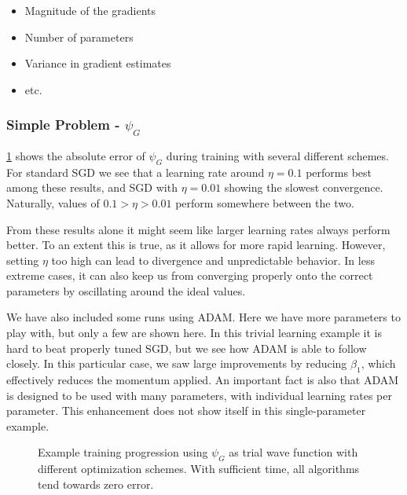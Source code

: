 \documentclass[Thesis.tex]{subfiles}
\begin{document}
\begin{itemize}
  \item Magnitude of the gradients
  \item Number of parameters
  \item Variance in gradient estimates
  \item etc.
\end{itemize}


\subsubsection{Simple Problem - $\psi_G$}

\cref{fig:verify-lr-gaussian} shows the absolute error of $\psi_G$ during
training with several different schemes. For standard SGD we see that a learning
rate around $\eta = 0.1$ performs best among these results, and SGD with $\eta
=0.01$ showing the slowest convergence. Naturally, values of $0.1>\eta>0.01$
perform somewhere between the two.

From these results alone it might seem like
larger learning rates always perform better. To an extent this is true, as it
allows for more rapid learning. However, setting $\eta$ too high can lead to
divergence and unpredictable behavior. In less extreme cases, it can also keep
us from converging properly onto the correct parameters by oscillating around
the ideal values.

We have also included some runs using ADAM. Here we have more parameters to play
with, but only a few are shown here. In this trivial learning example it is hard
to beat properly tuned SGD, but we see how ADAM is able to follow closely. In
this particular case, we saw large improvements by reducing $\beta_1$, which
effectively reduces the momentum applied. An important fact is also that ADAM is
designed to be used with many parameters, with individual learning rates per
parameter. This enhancement does not show itself in this single-parameter example.


\begin{figure}[h]
  \centering
    \resizebox{\linewidth}{!}{%
      
    }
  \caption[Comparison of optimization schemes on a simple problem]{\label{fig:verify-lr-gaussian}Example training progression using
    $\psi_G$ as trial wave function with different optimization schemes. With
    sufficient time, all algorithms tend towards zero error.}
\end{figure}
\end{document}

